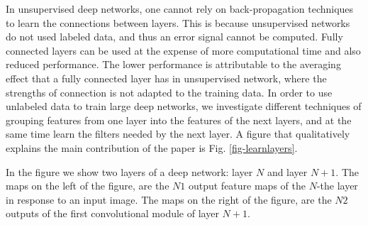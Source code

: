 \documentclass{article} %
\begin{document}
In unsupervised deep networks, one cannot rely on back-propagation techniques to learn the connections between layers. 
This is because unsupervised networks do not used labeled data, and thus an error signal cannot be computed. 
Fully connected layers can be used \cite{culurciello2013clustering,coates_analysis_2011} at the expense of more computational time
 and also reduced performance. The lower performance is attributable to the averaging effect that a fully connected layer has in 
 unsupervised network, where the strengths of connection is not adapted to the training data. In order to use unlabeled data to train 
 large deep networks, we investigate different techniques of grouping features from one layer into the features of the next layers, 
 and at the same time learn the filters needed by the next layer. A figure that qualitatively explains the main contribution of the paper is Fig. \ref{fig-learnlayers}.

In the figure we show two layers of a deep network: layer $N$ and layer $N+1$. The maps on the left of the figure, 
are the $N1$ output feature maps of the $N$-the layer in response to an input image. The maps on the right of the figure, 
are the $N2$ outputs of the first convolutional module of layer $N+1$. 
\end{document}
